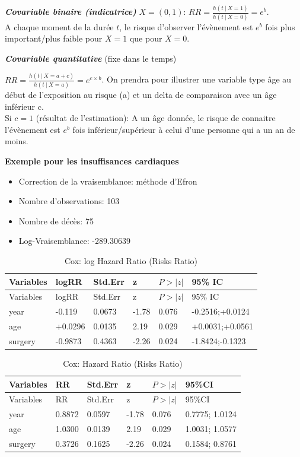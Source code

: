 \documentclass[
  12pt,
  letterpaper,
  DIV=11,
  numbers=noendperiod,
  onepage,
  openany]{scrreprt}
\begin{document}
\textbf{\emph{Covariable binaire (indicatrice)}} \(X=(0,1)\):
\(RR=\frac{h(t\ |\ X=1)}{h(t\ |\ X=0)}=e^b\).\\
A chaque moment de la durée \(t\), le risque d'observer l'évènement est
\(e^b\) fois plus important/plus faible pour \(X=1\) que pour \(X=0\).

\textbf{\emph{Covariable quantitative}} (fixe dans le temps)

\(RR=\frac{h(t\ |\ X=a+c)}{h(t\ |\ X=a)}=e^{c \times{b}}\). On prendra
pour illustrer une variable type âge au début de l'exposition au risque
(a) et un delta de comparaison avec un âge inférieur c.\\
Si \(c=1\) (résultat de l'estimation): A un âge donnée, le risque de
connaitre l'évènement est \(e^b\) fois inférieur/supérieur à celui d'une
personne qui a un an de moins.

\textbf{Exemple pour les insuffisances cardiaques}

\begin{itemize}
\item
  Correction de la vraisemblance: méthode d'Efron
\item
  Nombre d'observations: 103
\item
  Nombre de décès: 75
\item
  Log-Vraisemblance: -289.30639
\end{itemize}

\begin{longtable}[]{@{}llllll@{}}
\caption{Cox: log Hazard Ratio (Risks Ratio)}\tabularnewline
\toprule\noalign{}
Variables & logRR & Std.Err & z & \(P>|z|\) & 95\% IC \\
\midrule\noalign{}
\endfirsthead
\toprule\noalign{}
Variables & logRR & Std.Err & z & \(P>|z|\) & 95\% IC \\
\midrule\noalign{}
\endhead
\bottomrule\noalign{}
\endlastfoot
year & -0.119 & 0.0673 & -1.78 & 0.076 & -0.2516;+0.0124 \\
age & +0.0296 & 0.0135 & 2.19 & 0.029 & +0.0031;+0.0561 \\
surgery & -0.9873 & 0.4363 & -2.26 & 0.024 & -1.8424;-0.1323 \\
\end{longtable}

\begin{longtable}[]{@{}llllll@{}}
\caption{Cox: Hazard Ratio (Risks Ratio)}\tabularnewline
\toprule\noalign{}
Variables & RR & Std.Err & z & \(P>|z|\) & 95\%CI \\
\midrule\noalign{}
\endfirsthead
\toprule\noalign{}
Variables & RR & Std.Err & z & \(P>|z|\) & 95\%CI \\
\midrule\noalign{}
\endhead
\bottomrule\noalign{}
\endlastfoot
year & 0.8872 & 0.0597 & -1.78 & 0.076 & 0.7775; 1.0124 \\
age & 1.0300 & 0.0139 & 2.19 & 0.029 & 1.0031; 1.0577 \\
surgery & 0.3726 & 0.1625 & -2.26 & 0.024 & 0.1584; 0.8761 \\
\end{longtable}
\end{document}
